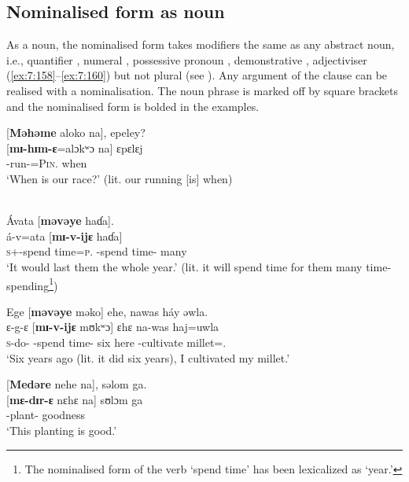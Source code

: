 \subsection{Nominalised form as noun}\label{sec:7.6.1}
\hypertarget{RefHeading1212421525720847}{}
As a noun, the nominalised form takes modifiers the same as any abstract noun, i.e., quantifier  , numeral , possessive pronoun , demonstrative , adjectiviser (\ref{ex:7:158}--\ref{ex:7:160}) but not plural (see ). Any argument of the clause can be realised with a nominalisation. The noun phrase is marked off by square brackets and the nominalised form is bolded in the examples. 

\ea\label{ex:7:154}
{}[\textbf{Məhəme} aloko   na],  epeley?~\\
\gll  {}[\textbf{mɪ-hɪm-ɛ}=alɔkʷɔ    na]  ɛpɛlɛj~\\
      {\NOM}{}-run-{\CL}=\textsc{Pin}.{\POSS}  {\PSP}  when\\
\glt  ‘When is our race?’ (lit. our running [is] when)\\
\z 

\clearpage
\ea\label{ex:7:155}\\
 Ávata  [\textbf{məvəye}  haɗa].\\
\gll  á-v=ata       [\textbf{mɪ-v-ijɛ}      haɗa]\\
      \textsc{s}+{\IFV}-{spend time}=\textsc{p}.{\IO}  {\NOM}{}-{spend time}-{\CL}  many\\
\glt  ‘It would last them the whole year.’  (lit. it will {spend time} for them many time-spending\footnote{The nominalised form of the verb ‘{spend time}’ has been lexicalized as ‘year.’})\\
\z 

\ea\label{ex:7:156}
Ege  [\textbf{məvəye} məko] ehe,  nawas  háy  əwla.\\
\gll  ɛ{}-g-ɛ  [\textbf{mɪ-v-ijɛ}  mʊkʷɔ]  ɛhɛ  na-was    haj=uwla\\
      \textsc{s}-do-{\CL}  {\NOM}{}-{spend time}-{\CL}  six  here  {\oneS}-cultivate  millet={\oneS}.{\POSS}\\
\glt ‘Six years ago (lit. it did six years), I cultivated my millet.’ 
\z

\ea\label{ex:7:157}
{}[\textbf{Medəre}  nehe   na],  səlom  ga.\\
\gll  {}[\textbf{mɛ-dɪr-ɛ}    nɛhɛ  na]  sʊlɔm    ga\\
      {\NOM}{}-plant-{\CL}  {\DEM}  {\PSP}  goodness  {\ADJ}\\
\glt  ‘This planting is good.’\\
\z

